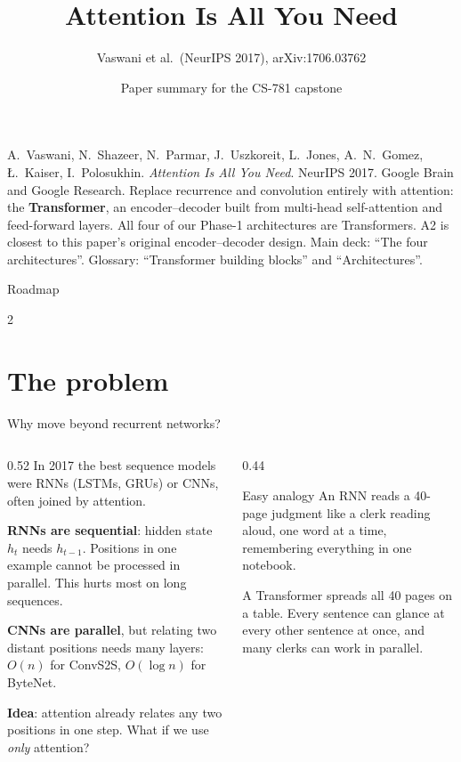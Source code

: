 \documentclass[aspectratio=169,11pt]{beamer}
\title[Attention Is All You Need]{Attention Is All You Need}
\subtitle{Vaswani et al.\ (NeurIPS 2017), arXiv:1706.03762}
\author[Paper summary]{Paper summary for the CS-781 capstone}
\date{}
\begin{document}
\begin{frame}\titlepage\end{frame}

\paperglance
{A.\ Vaswani, N.\ Shazeer, N.\ Parmar, J.\ Uszkoreit, L.\ Jones, A.\ N.\ Gomez, {\L}.\ Kaiser, I.\ Polosukhin. \emph{Attention Is All You Need}. NeurIPS 2017. Google Brain and Google Research.}
{Replace recurrence and convolution entirely with attention: the \textbf{Transformer}, an encoder--decoder built from multi-head self-attention and feed-forward layers.}
{All four of our Phase-1 architectures are Transformers. A2 is closest to this paper's original encoder--decoder design.}
{Main deck: ``The four architectures''. Glossary: ``Transformer building blocks'' and ``Architectures''.}

\begin{frame}{Roadmap}
  \begin{multicols}{2}\small\tableofcontents\end{multicols}
\end{frame}

\section{The problem}

\begin{frame}{Why move beyond recurrent networks?}
  \begin{columns}[T]
    \begin{column}{0.52\textwidth}
      \small
      In 2017 the best sequence models were RNNs (LSTMs, GRUs) or CNNs, often joined by attention.
      \vspace{1mm}

      \textbf{RNNs are sequential}: hidden state $h_t$ needs $h_{t-1}$. Positions in one example cannot be processed in parallel. This hurts most on long sequences.
      \vspace{1mm}

      \textbf{CNNs are parallel}, but relating two distant positions needs many layers: $O(n)$ for ConvS2S, $O(\log n)$ for ByteNet.
      \vspace{1mm}

      \textbf{Idea}: attention already relates any two positions in one step. What if we use \emph{only} attention?
    \end{column}
    \begin{column}{0.44\textwidth}
      \begin{exampleblock}{Easy analogy}
        \small
        An RNN reads a 40-page judgment like a clerk reading aloud, one word at a time, remembering everything in one notebook.
        \vspace{1mm}

        A Transformer spreads all 40 pages on a table. Every sentence can glance at every other sentence at once, and many clerks can work in parallel.
      \end{exampleblock}
    \end{column}
  \end{columns}
\end{frame}
\end{document}
